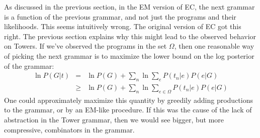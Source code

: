 \documentclass{article}
\begin{document}
As discussed in the previous section, in the EM version of EC, the next grammar is a function of the previous grammar, and not just the programs and their likelihoods.
This seems intuitively wrong. The original version of EC got this right.
The previous section explains why this might lead to the observed behavior on Towers.
If we've observed the programs in the set $\Omega$, then one reasonable way of picking the next grammar is to maximize the lower bound on the log posterior of the grammar:
\begin{eqnarray*}
\ln P(G|t) &=& \ln P(G) + \sum_n \ln \sum_e P(t_n|e)P(e|G)\\
&\geq& \ln P(G) + \sum_n \ln \sum_{e\in \Omega} P(t_n|e)P(e|G)
\end{eqnarray*}
One could approximately maximize this quantity by greedily adding productions to the grammar, or by an EM-like procedure.
If this was the cause of the lack of abstraction in the Tower grammar, then we would see bigger, but more compressive, combinators in the grammar.
\end{document}
